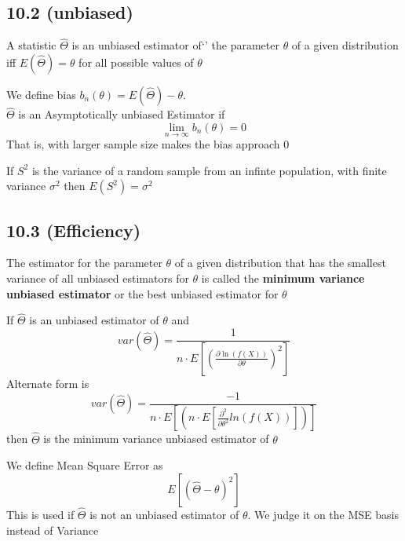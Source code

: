 \documentclass[answers,12pt,addpoints]{exam}
\begin{document}
\subsection{10.2 (unbiased)}
\begin{definition}
    A statistic $\hat{\Theta}$ is an unbiased estimator of`' the parameter $\theta$ of a given distribution iff $E(\hat{\Theta}) = \theta$ for all possible values of $\theta$
\end{definition}
\begin{definition}
    We define bias $b_n(\theta) = E(\hat{\Theta}) - \theta$.\\
    $\hat{\Theta}$ is an Asymptotically unbiased Estimator if 
    $$ \lim_{n \to \infty} b_n(\theta) = 0$$
    That is, with larger sample size makes the bias approach 0
\end{definition}
\begin{theorem}
    If $S^2$ is the variance of a random sample from an infinte population, with finite variance $\sigma^2$ then $E(S^2) =\sigma^2$
\end{theorem}
\subsection{10.3 (Efficiency)}
\begin{definition}
    The estimator for the parameter $\theta$ of a given distribution that has the smallest variance of all unbiased estimators for $\theta$ is called the \textbf{minimum variance unbiased estimator} or the best unbiased estimator for $\theta$
\end{definition}
\begin{definition}
    If $\hat{\Theta}$ is an unbiased estimator of $\theta$ and 
    $$ var(\hat{\Theta}) = \frac{1}{n \cdot E\left[ \left( \frac{\partial \ln(f(X))}{\partial \theta} \right)^2 \right]} $$
    Alternate form is 
    $$ var(\hat{\Theta}) = \frac{-1}{n \cdot E\left[ \left( n \cdot E[\frac{\partial^2}{\partial\theta^2} ln(f(X))] \right) \right]} $$
    then $\hat{\Theta}$ is the minimum variance unbiased estimator of $\theta$
\end{definition}
\begin{definition}
    We define Mean Square Error as 
    $$ E[(\hat{\Theta} - \theta)^2]$$
    This is used if $\hat{\Theta}$ is not an unbiased estimator of $\theta$. We judge it on the MSE basis instead of Variance
\end{definition}
\end{document}
